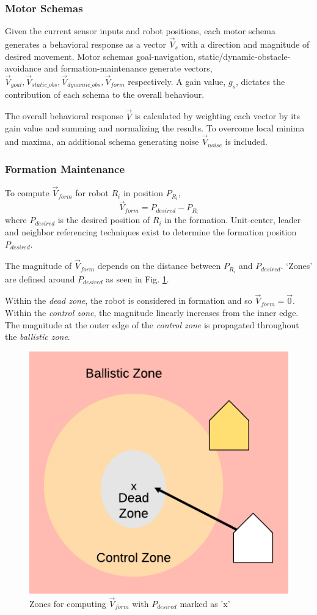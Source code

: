 \documentclass[letterpaper, 10 pt, conference]{ieeeconf}  %
\begin{document}
	\subsubsection*{Motor Schemas}
	Given the current sensor inputs and robot positions, each motor schema generates a behavioral response as a vector $\vec{V}_s$ with a direction and magnitude of desired movement. Motor schemas goal-navigation, static/dynamic-obstacle-avoidance and formation-maintenance generate vectors, $\vec{V}_{goal}, \vec{V}_{static\_obs}, \vec{V}_{dynamic\_obs}, \vec{V}_{form}$ respectively. A gain value, $g_s$, dictates the contribution of each schema to the overall behaviour.  
	
	The overall behavioral response $\vec{V}$ is calculated by weighting each vector by its gain value and summing and normalizing the results. To overcome local minima and maxima, an additional schema generating noise $\vec{V}_{noise}$ is included.
	
	\subsubsection*{Formation Maintenance}
	
	To compute $\vec{V}_{form}$ for robot $R_i$ in position $P_{R_i}$,
	\[\vec{V}_{form} = P_{desired} - P_{R_i}\]
	where $P_{desired}$ is the desired position of $R_i$ in the formation. 
	Unit-center, leader and neighbor referencing techniques exist to determine the formation position $P_{desired}$.
	
	The magnitude of $\vec{V}_{form}$ depends on the distance between $P_{R_i}$ and $P_{desired}$. `Zones' are defined around $P_{desired}$ as seen in Fig. \ref{formation_zones}. 
	
	Within the \textit{dead zone}, the robot is considered in formation and so $\vec{V}_{form} = \vec{0}$. Within the \textit{control zone}, the magnitude linearly increases from the inner edge. The magnitude at the outer edge of the \textit{control zone} is propagated throughout the \textit{ballistic zone}.
	
	\begin{figure}[ht]
		\centering
		\includegraphics[width=0.45\linewidth]{images/formation_zones.png}
		\caption{Zones for computing $\vec{V}_{form}$ with $P_{desired}$ marked as 'x'}
		\label{formation_zones}
	\end{figure}
	
\end{document}
